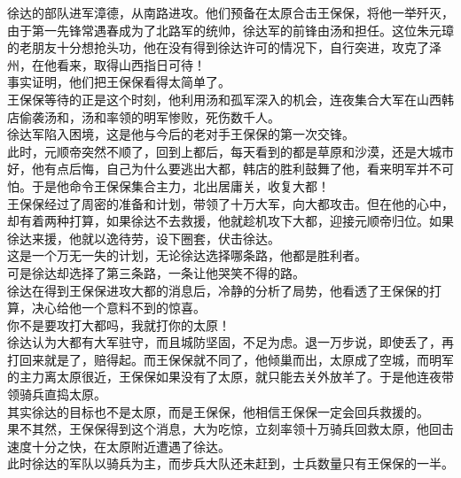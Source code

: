 \begin{multicols}{\theparacolNo}
徐达的部队进军漳德，从南路进攻。他们预备在太原合击王保保，将他一举歼灭，由于第一先锋常遇春成为了北路军的统帅，徐达军的前锋由汤和担任。这位朱元璋的老朋友十分想抢头功，他在没有得到徐达许可的情况下，自行突进，攻克了泽州，在他看来，取得山西指日可待！\\

事实证明，他们把王保保看得太简单了。\\

王保保等待的正是这个时刻，他利用汤和孤军深入的机会，连夜集合大军在山西韩店偷袭汤和，汤和率领的明军惨败，死伤数千人。\\

徐达军陷入困境，这是他与今后的老对手王保保的第一次交锋。\\

此时，元顺帝突然不顺了，回到上都后，每天看到的都是草原和沙漠，还是大城市好，他有点后悔，自己为什么要逃出大都，韩店的胜利鼓舞了他，看来明军并不可怕。于是他命令王保保集合主力，北出居庸关，收复大都！\\

王保保经过了周密的准备和计划，带领了十万大军，向大都攻击。但在他的心中，却有着两种打算，如果徐达不去救援，他就趁机攻下大都，迎接元顺帝归位。如果徐达来援，他就以逸待劳，设下圈套，伏击徐达。\\

这是一个万无一失的计划，无论徐达选择哪条路，他都是胜利者。\\

可是徐达却选择了第三条路，一条让他哭笑不得的路。\\

徐达在得到王保保进攻大都的消息后，冷静的分析了局势，他看透了王保保的打算，决心给他一个意料不到的惊喜。\\

你不是要攻打大都吗，我就打你的太原！\\

徐达认为大都有大军驻守，而且城防坚固，不足为虑。退一万步说，即使丢了，再打回来就是了，赔得起。而王保保就不同了，他倾巢而出，太原成了空城，而明军的主力离太原很近，王保保如果没有了太原，就只能去关外放羊了。于是他连夜带领骑兵直捣太原。\\

其实徐达的目标也不是太原，而是王保保，他相信王保保一定会回兵救援的。\\

果不其然，王保保得到这个消息，大为吃惊，立刻率领十万骑兵回救太原，他回击速度十分之快，在太原附近遭遇了徐达。\\

此时徐达的军队以骑兵为主，而步兵大队还未赶到，士兵数量只有王保保的一半。\\


\end{multicols}
